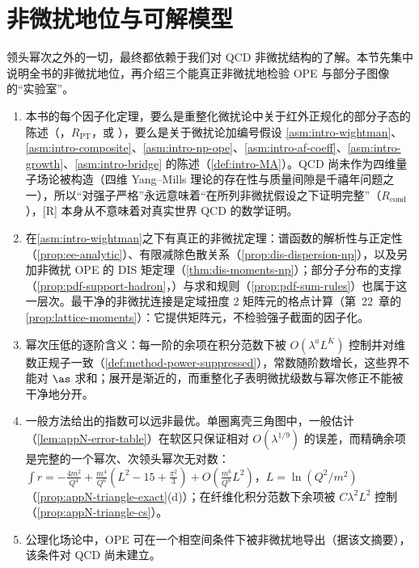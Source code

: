 \section{非微扰地位与可解模型}\label{sec:power-np}

领头幂次之外的一切，最终都依赖于我们对 QCD 非微扰结构的了解。本节先集中说明全书的非微扰地位，再介绍三个能真正非微扰地检验 OPE 与部分子图像的“实验室”。

\begin{remark}[非微扰地位]\label{rem:power-np-status}
\begin{enumerate}[label=(\roman*),leftmargin=1.8em,itemsep=1pt,topsep=2pt]
\item 本书的每个因子化定理，要么是重整化微扰论中关于红外正规化的部分子态的陈述（\tagR，$R_{\mathrm{PT}}$，或 \tagA），要么是关于微扰论加编号假设 \cref{asm:intro-wightman}、\cref{asm:intro-composite}、\cref{asm:intro-np-ope}、\cref{asm:intro-af-coeff}、\cref{asm:intro-growth}、\cref{asm:intro-bridge} 的陈述（\cref{def:intro-MA}）。QCD 尚未作为四维量子场论被构造（四维 Yang--Mills 理论的存在性与质量间隙是千禧年问题之一），所以“对强子严格”永远意味着“在所列非微扰假设之下证明完整”（$R_{\mathrm{cond}}$），[R] 本身从不意味着对真实世界 QCD 的数学证明。%
\item 在\cref{asm:intro-wightman}之下有真正的非微扰定理：谱函数的解析性与正定性（\cref{prop:ee-analytic}）、有限减除色散关系（\cref{prop:dis-dispersion-np}），以及另加非微扰 OPE 的 DIS 矩定理（\cref{thm:dis-moments-np}）；部分子分布的支撑（\cref{prop:pdf-support-hadron}，\tagA）与求和规则（\cref{prop:pdf-sum-rules}）也属于这一层次。最干净的非微扰连接是定域扭度 2 矩阵元的格点计算（第~22~章的\cref{prop:lattice-moments}）：它提供矩阵元，不检验强子截面的因子化。
\item 幂次压低的逐阶含义：每一阶的余项在积分范数下被 $O(\lambda^aL^K)$ 控制并对维数正规子一致（\cref{def:method-power-suppressed}），常数随阶数增长，这些界不能对 $\as$ 求和；展开是渐近的，而重整化子表明微扰级数与幂次修正不能被干净地分开。
\item 一般方法给出的指数可以远非最优。单圈离壳三角图中，一般估计（\cref{lem:appN-error-table}）在软区只保证相对 $O(\lambda^{1/9})$ 的误差，而精确余项是完整的一个幂次、次领头幂次无对数：$\int r=-\frac{4m^2}{Q^4}+\frac{m^4}{Q^6}(L^2-15+\frac{\pi^2}{3})+O(\frac{m^6}{Q^8}L^2)$，$L=\ln(Q^2/m^2)$（\cref{prop:appN-triangle-exact}(d)）；在纤维化积分范数下余项被 $C\lambda^2L^2$ 控制（\cref{prop:appN-triangle-cs}）。
\item 公理化场论中，OPE 可在一个相空间条件下被非微扰地导出\cite{Bostelmann:2005rr}（据该文摘要），该条件对 QCD 尚未建立。

\end{enumerate}
\end{remark}
